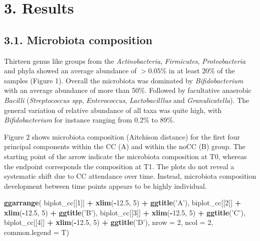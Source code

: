 \documentclass[]{article}
\newenvironment{Shaded}{\begin{snugshade}}{\end{snugshade}}
\newcommand{\KeywordTok}[1]{\textcolor[rgb]{0.13,0.29,0.53}{\textbf{#1}}}
\newcommand{\DataTypeTok}[1]{\textcolor[rgb]{0.13,0.29,0.53}{#1}}
\newcommand{\DecValTok}[1]{\textcolor[rgb]{0.00,0.00,0.81}{#1}}
\newcommand{\FloatTok}[1]{\textcolor[rgb]{0.00,0.00,0.81}{#1}}
\newcommand{\StringTok}[1]{\textcolor[rgb]{0.31,0.60,0.02}{#1}}
\newcommand{\OperatorTok}[1]{\textcolor[rgb]{0.81,0.36,0.00}{\textbf{#1}}}
\newcommand{\NormalTok}[1]{#1}
\begin{document}
\section{3. Results}\label{results}

\subsection{3.1. Microbiota composition}\label{microbiota-composition}

Thirteen genus like groups from the \emph{Actinobacteria},
\emph{Firmicutes}, \emph{Proteobacteria} and phyla showed an average
abundance of \(\gt 0.05\)\% in at least 20\% of the samples (Figure 1).
Overall the microbiota was dominated by \emph{Bifidobacterium} with an
average abundance of more than 50\%. Followed by facultative anaerobic
\emph{Bacilli} (\emph{Streptococcus spp}, \emph{Enterococcus},
\emph{Lactobacilllus} and \emph{Granulicatella}). The general variation
of relative abundance of all taxa was quite high, with
\emph{Bifidobacterium} for instance ranging from 0.2\% to 89\%.

Figure 2 shows microbiota composition (Aitchison distance) for the first
four principal components within the CC (A) and within the noCC (B)
group. The starting point of the arrow indicate the microbiota
composition at T0, whereas the endpoint corresponds the composition at
T1. The plots do not reveal a systematic shift due to CC attendance over
time. Instead, microbiota composition development between time points
appears to be highly individual.

\begin{Shaded}
\begin{Highlighting}[]
\KeywordTok{ggarrange}\NormalTok{(}
\NormalTok{    biplot_cc[[}\DecValTok{1}\NormalTok{]] }\OperatorTok{+}\StringTok{ }\KeywordTok{xlim}\NormalTok{(}\OperatorTok{-}\FloatTok{12.5}\NormalTok{, }\DecValTok{5}\NormalTok{) }\OperatorTok{+}\StringTok{ }\KeywordTok{ggtitle}\NormalTok{(}\StringTok{'A'}\NormalTok{), }
\NormalTok{    biplot_cc[[}\DecValTok{2}\NormalTok{]] }\OperatorTok{+}\StringTok{ }\KeywordTok{xlim}\NormalTok{(}\OperatorTok{-}\FloatTok{12.5}\NormalTok{, }\DecValTok{5}\NormalTok{) }\OperatorTok{+}\StringTok{ }\KeywordTok{ggtitle}\NormalTok{(}\StringTok{'B'}\NormalTok{), }
\NormalTok{    biplot_cc[[}\DecValTok{3}\NormalTok{]] }\OperatorTok{+}\StringTok{ }\KeywordTok{xlim}\NormalTok{(}\OperatorTok{-}\FloatTok{12.5}\NormalTok{, }\DecValTok{5}\NormalTok{) }\OperatorTok{+}\StringTok{ }\KeywordTok{ggtitle}\NormalTok{(}\StringTok{'C'}\NormalTok{), }
\NormalTok{    biplot_cc[[}\DecValTok{4}\NormalTok{]] }\OperatorTok{+}\StringTok{ }\KeywordTok{xlim}\NormalTok{(}\OperatorTok{-}\FloatTok{12.5}\NormalTok{, }\DecValTok{5}\NormalTok{) }\OperatorTok{+}\StringTok{ }\KeywordTok{ggtitle}\NormalTok{(}\StringTok{'D'}\NormalTok{), }
    \DataTypeTok{nrow =} \DecValTok{2}\NormalTok{, }\DataTypeTok{ncol =} \DecValTok{2}\NormalTok{, }
    \DataTypeTok{common.legend =}\NormalTok{ T)}
\end{Highlighting}
\end{Shaded}
\end{document}
